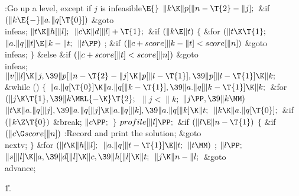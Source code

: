 \B{}:Go up a level, except  if
$j$ is infeasible\X${}\E{}$\6
$\|k\K\|p[\|n-\T{2}-\|j];{}$\6
\&{if} ${}(\|k\E{-}\|a.\|q[\T{0}]){}$\1\5
\&{goto} \\{infeas};\2\6
${}\|t\K\|h[\|l];{}$\6
${}\|c\K\|d[\|l]+\T{1};{}$\6
\&{if} ${}(\|k\E\|t){}$\5
${}\{{}$\1\6
\&{for} ${}(\|t\K\T{1};{}$ ${}\|a.\|q[\|t]\E\|k-\|t;{}$ ${}\|t\PP){}$\1\5
;\2\6
\&{if} ${}(\|c+\\{score}[\|k-\|t]<\\{score}[\|n]){}$\1\5
\&{goto} \\{infeas};\2\6
\4${}\}{}$\5
\2\&{else} \&{if} ${}(\|c+\\{score}[\|t]<\\{score}[\|n]){}$\1\5
\&{goto} \\{infeas};\2\6
${}\|v[\|l]\K\|j,\39\|p[\|n-\T{2}-\|j]\K\|p[\|l-\T{1}],\39\|p[\|l-\T{1}]\K%
\|k;{}$\6
\&{while} ()\5
${}\{{}$\1\6
${}\|a.\|q[\T{0}]\K\|a.\|q[\|k-\T{1}],\39\|a.\|q[\|k-\T{1}]\K\|k;{}$\6
\&{for} ${}(\|j\K\T{1},\39\|k\MRL{-{\K}}\T{2};{}$ ${}\|j<\|k;{}$ ${}\|j\PP,\39%
\|k\MM){}$\1\5
${}\|t\K\|a.\|q[\|j],\39\|a.\|q[\|j]\K\|a.\|q[\|k],\39\|a.\|q[\|k]\K\|t;{}$\2\6
${}\|k\K\|a.\|q[\T{0}];{}$\6
\&{if} ${}(\|k\Z\T{0}){}$\1\5
\&{break};\2\6
${}\|c\PP;{}$\6
\4${}\}{}$\2\6
${}\\{profile}[\|l]\PP;{}$\6
\&{if} ${}(\|l\E\|n-\T{1}){}$\5
${}\{{}$\1\6
\&{if} ${}(\|c\G\\{score}[\|n]){}$\1\5
:Record and print the solution\X;\2\6
\&{goto} \\{nextv};\6
\4${}\}{}$\2\6
\&{for} ${}(\|t\K\|h[\|l];{}$ ${}\|a.\|q[\|t-\T{1}]\E\|t;{}$ ${}\|t\MM){}$\1\5
;\2\6
${}\|l\PP;{}$\6
${}\|s[\|l]\K\|a,\39\|d[\|l]\K\|c,\39\|h[\|l]\K\|t;{}$\6
${}\|j\K\|n-\|l;{}$\6
\&{goto} \\{advance};\par
\U1.\fi


